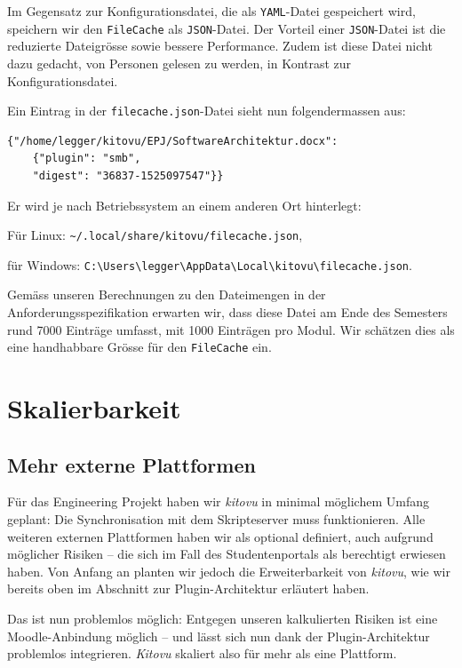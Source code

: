 \documentclass[a4paper]{article}
\let\oldsection\section
\renewcommand\section{\clearpage\oldsection}
\begin{document}
Im Gegensatz zur Konfigurationsdatei, die als \verb|YAML|-Datei gespeichert wird, speichern wir den \verb|FileCache| als \verb|JSON|-Datei. Der Vorteil einer \verb|JSON|-Datei ist die reduzierte Dateigrösse sowie bessere Performance. Zudem ist diese Datei nicht dazu gedacht, von Personen gelesen zu werden, in Kontrast zur Konfigurationsdatei.

Ein Eintrag in der \verb|filecache.json|-Datei sieht nun folgendermassen aus:

\begin{verbatim}
{"/home/legger/kitovu/EPJ/SoftwareArchitektur.docx": 
	{"plugin": "smb", 
	"digest": "36837-1525097547"}}
\end{verbatim}

Er wird je nach Betriebssystem an einem anderen Ort hinterlegt: 

Für Linux: \verb|~/.local/share/kitovu/filecache.json|,

für Windows: \verb|C:\Users\legger\AppData\Local\kitovu\filecache.json|.

Gemäss unseren Berechnungen zu den Dateimengen in der Anforderungsspezifikation erwarten wir, dass diese Datei am Ende des Semesters rund 7000 Einträge umfasst, mit 1000 Einträgen pro Modul. Wir schätzen dies als eine handhabbare Grösse für den \verb|FileCache| ein.

\section{Skalierbarkeit}

\subsection{Mehr externe Plattformen}

Für das Engineering Projekt haben wir \emph{kitovu} in minimal möglichem Umfang geplant: Die Synchronisation mit dem Skripteserver muss funktionieren. Alle weiteren externen Plattformen haben wir als optional definiert, auch aufgrund möglicher Risiken -- die sich im Fall des Studentenportals als berechtigt erwiesen haben. Von Anfang an planten wir jedoch die Erweiterbarkeit von \emph{kitovu}, wie wir bereits oben im Abschnitt zur Plugin-Architektur erläutert haben. 

Das ist nun problemlos möglich: Entgegen unseren kalkulierten Risiken ist eine Moodle-Anbindung möglich -- und lässt sich nun dank der Plugin-Architektur problemlos integrieren. \emph{Kitovu} skaliert also für mehr als eine Plattform.
\end{document}
